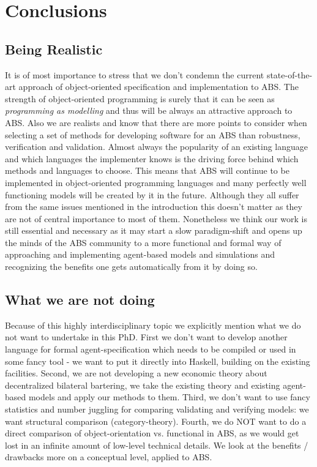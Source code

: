 \chapter{Conclusions}
\label{chap:concl}

\section{Being Realistic}
It is of most importance to stress that we don't condemn the current state-of-the-art approach of object-oriented specification and implementation to ABS. The strength of object-oriented programming is surely that it can be seen as \textit{programming as modelling} and thus will be always an attractive approach to ABS. Also we are realists and know that there are more points to consider when selecting a set of methods for developing software for an ABS than robustness, verification and validation. Almost always the popularity of an existing language and which languages the implementer knows is the driving force behind which methods and languages to choose. This means that ABS will continue to be implemented in object-oriented programming languages and many perfectly well functioning models will be created by it in the future. Although they all suffer from the same issues mentioned in the introduction this doesn't matter as they are not of central importance to most of them.
Nonetheless we think our work is still essential and necessary as it may start a slow paradigm-shift and opens up the minds of the ABS community to a more functional and formal way of approaching and implementing agent-based models and simulations and recognizing the benefits one gets automatically from it by doing so.

\section{What we are not doing}
Because of this highly interdisciplinary topic we explicitly mention what we do not want to undertake in this PhD.
First we don't want to develop another language for formal agent-specification which needs to be compiled or used in some fancy tool - we want to put it directly into Haskell, building on the existing facilities.
Second, we are not developing a new economic theory about decentralized bilateral bartering, we take the existing theory and existing agent-based models and apply our methods to them.
Third, we don't want to use fancy statistics and number juggling for comparing validating and verifying models: we want structural comparison (category-theory).
Fourth, we do NOT want to do a direct comparison of object-orientation vs. functional in ABS, as we would get lost in an infinite amount of low-level technical details. We look at the benefits / drawbacks more on a conceptual level, applied to ABS.